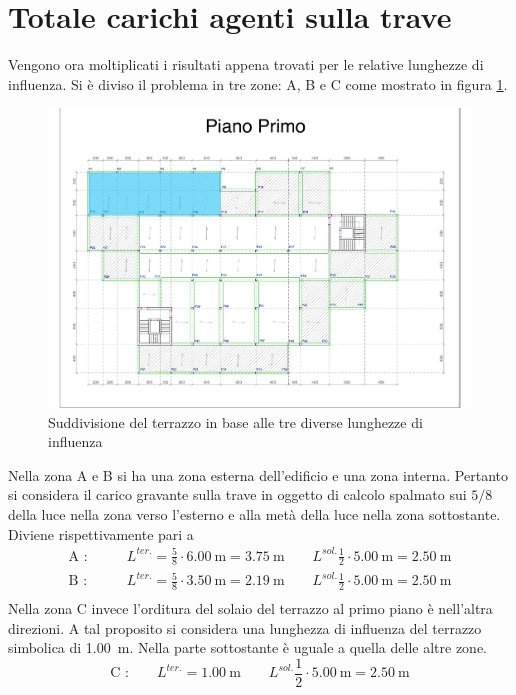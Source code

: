\section{Totale carichi agenti sulla trave}
Vengono ora moltiplicati i risultati appena trovati per le relative lunghezze di influenza. 
Si è diviso il problema in tre zone: A, B e C come mostrato in figura \ref{fig:traveZonaABC}. 
\begin{figure}[tbp]
\centering
\includegraphics[trim=5.8cm 13cm 9.5cm 4.1cm,clip,frame,width=\textwidth]{IMG/Piante/Piante-ABC.pdf} 
\caption{Suddivisione del terrazzo in base alle tre diverse lunghezze di influenza}
\label{fig:traveZonaABC}
\end{figure}
Nella zona A e B si ha una zona esterna dell'edificio e una zona interna.
Pertanto si considera il carico gravante sulla trave in oggetto di calcolo spalmato sui $5/8$ della luce nella zona verso l'esterno e alla metà della luce nella zona sottostante.  
Diviene rispettivamente pari a 
\begin{align*}
	\text{A :}&\qquad L^{ter.}=\frac{5}{8}\cdot\SI{6.00}{\meter}=\SI{3.75}{\meter} \qquad 
				L^{sol.} \frac{1}{2}\cdot\SI{5.00}{\meter} = \SI{2.50}{\meter}\\
	\text{B :}&\qquad L^{ter.}=\frac{5}{8}\cdot\SI{3.50}{\meter}=\SI{2.19}{\meter} \qquad 
				L^{sol.} \frac{1}{2}\cdot\SI{5.00}{\meter} = \SI{2.50}{\meter}\\
\end{align*}
Nella zona C invece l'orditura del solaio del terrazzo al primo piano è nell'altra direzioni. 
A tal proposito si considera una lunghezza di influenza del terrazzo simbolica di \SI{1.00}{\meter}.
Nella parte sottostante è uguale a quella delle altre zone.
\[
	\text{C :}\qquad L^{ter.}=\SI{1.00}{\meter} \qquad 
				L^{sol.} \frac{1}{2}\cdot\SI{5.00}{\meter} = \SI{2.50}{\meter}
\]


